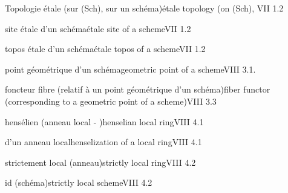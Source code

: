 

Topologie étale (sur (Sch), sur un schéma)\quad étale topology (on (Sch), \handwritten{)}\quad VII 1.2

site étale d'un schéma\quad étale site of a scheme\quad VII 1.2

topos étale d'un schéma\quad étale topos of a scheme\quad VII 1.2


point géométrique d'un schéma\quad geometric point of a scheme\quad VIII 3.1.

foncteur fibre (relatif à un point géométrique d'un schéma)\quad fiber functor (corresponding to a geometric point of a scheme)\quad VIII 3.3


hensélien (anneau local - )\quad henselian local ring\quad VIII 4.1

  d'un anneau local\quad henselization of a local ring\quad VIII 4.1

strictement local (anneau)\quad strictly local ring\quad VIII 4.2

\handwritten{---} id \handwritten{---} (schéma)\quad strictly local scheme\quad VIII 4.2

